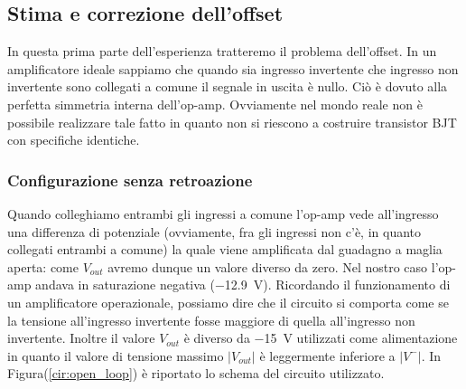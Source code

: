 \subsection{Stima e correzione dell'offset}
\label{par2:offset}

In questa prima parte dell'esperienza tratteremo il problema dell'offset. In un amplificatore ideale sappiamo che quando sia ingresso invertente che ingresso non invertente sono collegati a comune il segnale in uscita è nullo. Ciò è dovuto alla perfetta simmetria interna dell'op-amp. Ovviamente nel mondo reale non è possibile realizzare tale fatto in quanto non si riescono a costruire transistor BJT con specifiche identiche. 

\subsubsection{Configurazione senza retroazione}

Quando colleghiamo entrambi gli ingressi a comune l'op-amp vede all'ingresso una differenza di potenziale (ovviamente, fra gli ingressi non c'è, in quanto collegati entrambi a comune) la quale viene amplificata dal guadagno a maglia aperta: come $V_{out}$ avremo dunque un valore diverso da zero. Nel nostro caso l'op-amp andava in saturazione negativa (\SI{-12.9}{\volt}). Ricordando il funzionamento di un amplificatore operazionale, possiamo dire che il circuito si comporta come se la tensione all'ingresso invertente fosse maggiore di quella all'ingresso non invertente. Inoltre il valore $V_{out}$ è diverso da \SI{-15}{\volt} utilizzati come alimentazione in quanto il valore di tensione massimo $|V_{out}|$ è leggermente inferiore a $|V^-|$. In Figura(\ref{cir:open_loop}) è riportato lo schema del circuito utilizzato.

